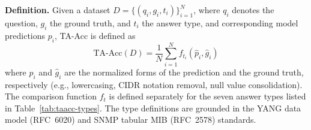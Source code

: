 

\textbf{Definition.}
Given a dataset $D = \{(q_i, g_i, t_i)\}_{i=1}^{N}$, where $q_i$ denotes the question, $g_i$ the ground truth, and $t_i$ the answer type, and corresponding model predictions $p_i$, TA-Acc is defined as
\begin{equation}
  \text{TA-Acc}(D) = \frac{1}{N} \sum_{i=1}^{N} f_{t_i}(\hat{p}_i, \hat{g}_i)
  \label{eq:taacc}
\end{equation}
where $\hat{p}_i$ and $\hat{g}_i$ are the normalized forms of the prediction and the ground truth, respectively (e.g., lowercasing, CIDR notation removal, null value consolidation).
The comparison function $f_t$ is defined separately for the seven answer types listed in Table~\ref{tab:taacc-types}. The type definitions are grounded in the YANG data model (RFC~6020) and SNMP tabular MIB (RFC~2578) standards.



